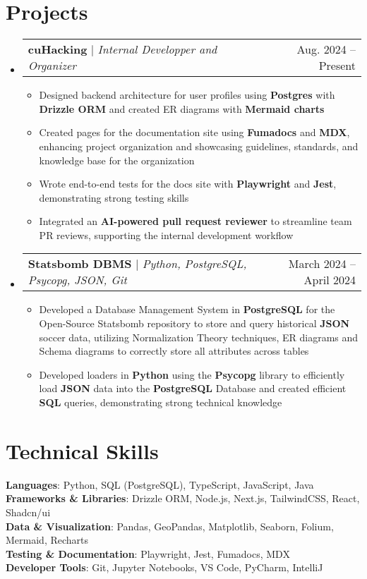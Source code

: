 \documentclass[letterpaper,11pt]{article}
\makeatletter
\newcommand{\resumeItem}[1]{
  \item\small{
    {#1 \vspace{-2pt}}
  }
}
\newcommand{\resumeProjectHeading}[2]{
    \item
    \begin{tabular*}{0.97\textwidth}{l@{\extracolsep{\fill}}r}
      \small#1 & #2 \\
    \end{tabular*}\vspace{-7pt}
}
\newcommand{\resumeSubHeadingListStart}{\begin{itemize}[leftmargin=0.15in, label={}]}
\newcommand{\resumeSubHeadingListEnd}{\end{itemize}}
\newcommand{\resumeItemListStart}{\begin{itemize}}
\newcommand{\resumeItemListEnd}{\end{itemize}\vspace{-5pt}}
\makeatother
\begin{document}
\section{Projects}
    \resumeSubHeadingListStart
      \resumeProjectHeading
      {\textbf{cuHacking} $|$ \emph{Internal Developper and Organizer}}{Aug.  2024 -- Present}
          \resumeItemListStart
           \resumeItem{Designed backend architecture for user profiles using \textbf{Postgres} with \textbf{Drizzle ORM} and created ER diagrams with \textbf{Mermaid charts}}
          \resumeItem{Created pages for the documentation site using \textbf{Fumadocs} and \textbf{MDX}, enhancing project organization and showcasing guidelines, standards, and knowledge base for the organization}
          \resumeItem{Wrote end-to-end tests for the docs site with \textbf{Playwright} and \textbf{Jest}, demonstrating strong testing skills}
          \resumeItem{Integrated an \textbf{AI-powered pull request reviewer} to streamline team PR reviews, supporting the internal development workflow}
          \resumeItemListEnd
      \resumeProjectHeading
          {\textbf{Statsbomb DBMS} $|$ \emph{Python, PostgreSQL, Psycopg, JSON, Git}}{March 2024 -- April 2024}
          \resumeItemListStart
            \resumeItem{Developed a Database Management System in \textbf{PostgreSQL} for the Open-Source Statsbomb repository to store and query historical \textbf{JSON} soccer data, utilizing Normalization Theory techniques, ER diagrams and Schema diagrams to correctly store all attributes across tables}
            \resumeItem{Developed loaders in \textbf{Python} using the \textbf{Psycopg} library to efficiently load \textbf{JSON} data into the \textbf{PostgreSQL} Database and created efficient \textbf{SQL} queries, demonstrating strong technical knowledge}
          \resumeItemListEnd
    \resumeSubHeadingListEnd



%
\section{Technical Skills}
 \begin{itemize}[leftmargin=0.15in, label={}]
    \small{\item{
    \textbf{Languages}{: Python, SQL (PostgreSQL), TypeScript, JavaScript, Java} \\
     \textbf{Frameworks \& Libraries}{: Drizzle ORM, Node.js, Next.js, TailwindCSS, React, Shadcn/ui} \\
     \textbf{Data \& Visualization}{: Pandas, GeoPandas, Matplotlib, Seaborn, Folium, Mermaid, Recharts} \\
     \textbf{Testing \& Documentation}{: Playwright, Jest, Fumadocs, MDX} \\
     \textbf{Developer Tools}{: Git, Jupyter Notebooks, VS Code, PyCharm, IntelliJ} \\
    }}
 \end{itemize}


\end{document}
